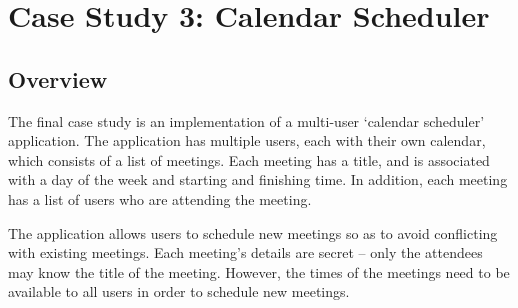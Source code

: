 \section{Case Study 3: Calendar Scheduler} \label{sect_cs_csched}

%
%
%
%
%
%
%
%
%
%
%
%
%
%
%

\subsection{Overview}

The final case study is an implementation of a multi-user `calendar scheduler' application. The application has multiple users, each with their own calendar, which consists of a list of meetings. Each meeting has a title, and is associated with a day of the week and starting and finishing time. In addition, each meeting has a list of users who are attending the meeting.

The application allows users to schedule new meetings so as to avoid conflicting with existing meetings. Each meeting's details are secret -- only the attendees may know the title of the meeting. However, the times of the meetings need to be available to all users in order to schedule new meetings.

